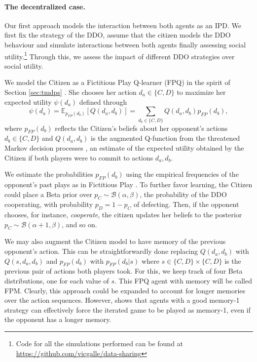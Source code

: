 \paragraph{The decentralized case.}\label{sec:decentralized}
Our first approach models the interaction between both agents as an IPD.  We first fix the strategy of the DDO, assume that the citizen models the DDO behaviour and simulate interactions between
both agents 
finally assessing social utility.\footnote{Code for all the simulations performed can be found at \url{https://github.com/vicgalle/data-sharing}}
Through this, we assess the impact of different 
DDO strategies over social utility.

We  model the Citizen as a Fictitious Play Q-learner (FPQ) in the spirit of Section \ref{sec:tmdps} \parencite{gallego2019opponent}.
She chooses her action $d_a \in \lbrace C, D \rbrace$
to maximize her expected utility $\psi(d_a)$
defined through 
\[ \psi(d_a) = \mathbb{E}_{p_{FP}(d_b)} [Q(d_a,d_b)] = \sum_{d_b \in \lbrace C, D \rbrace } Q(d_a, d_b) p_{FP}(d_b), \]
 where $p_{FP} (d_b)$ reflects the Citizen's beliefs about her opponent's
 actions $d_b \in \lbrace C, D \rbrace$
 and 
 $Q(d_a,d_b)$ is the augmented Q-function from the threatened Markov decision processes  \parencite{gallego2019opponent}, 
 an estimate of the expected utility obtained by the Citizen if both
 players were to commit to actions $d_a, d_b$.
 
 We estimate the probabilities $p_{FP} (d_b)$
  using the empirical frequencies of the opponent's past
  plays as in Fictitious Play 
 \parencite{brown1951iterative}. To further favor learning, the Citizen could 
place a Beta prior over $p_C \sim \mathcal{B}(\alpha, \beta)$,
the probability of the DDO cooperating, 
with probability $p_D = 1-p_C$ of defecting.
 Then, if the opponent chooses,
for instance, {\em cooperate}, the citizen updates her
beliefs to the posterior $p_C \sim \mathcal{B}(\alpha + 1, \beta)$, 
and so on. 

We may also augment the Citizen model to have memory
of the previous opponent's action. This can be
straightforwardly done replacing $Q(d_a,d_b)$ with $Q(s,d_a,d_b)$ and $p_{FP}(d_b)$ with $p_{FP}(d_b|s)$
where $s \in \lbrace C, D \rbrace \times \lbrace C, D \rbrace$ is
the previous pair of actions both players took. 
For this, we  
 keep track of four Beta distributions, one for each
value of $s$. This FPQ agent with
memory will be called FPM. 
Clearly, this approach could be expanded to account for 
longer memories over the action sequences. However,  \parencite{press2012iterated} shows that agents with a 
good memory-1 strategy can effectively force the iterated 
game to be played as memory-1, even if the opponent has a
longer memory.


